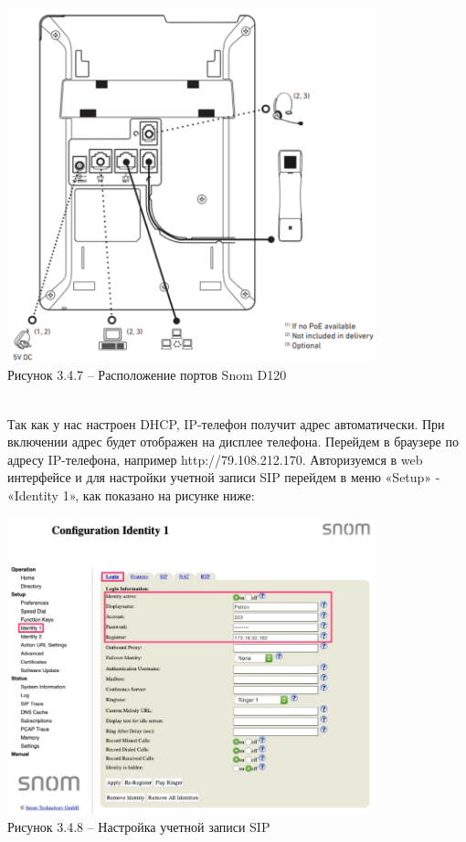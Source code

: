     \begin{center}
        \includegraphics[width=0.8\textwidth]{images/phone_ports}\\
        Рисунок 3.4.7 – Расположение портов Snom D120
    \end{center}
    \\
    Так как у нас настроен DHCP, IP-телефон получит адрес автоматически.
    При включении адрес будет отображен на дисплее телефона.
    Перейдем в браузере по адресу IP-телефона, например http://79.108.212.170.
    Авторизуемся в web интерфейсе и для настройки учетной записи SIP перейдем в меню «Setup» - «Identity 1»,
    как показано на рисунке ниже:
    \\
    \begin{center}
        \includegraphics[width=0.8\textwidth]{images/identity1}\\
        Рисунок 3.4.8 – Настройка учетной записи SIP
    \end{center}
    \\

